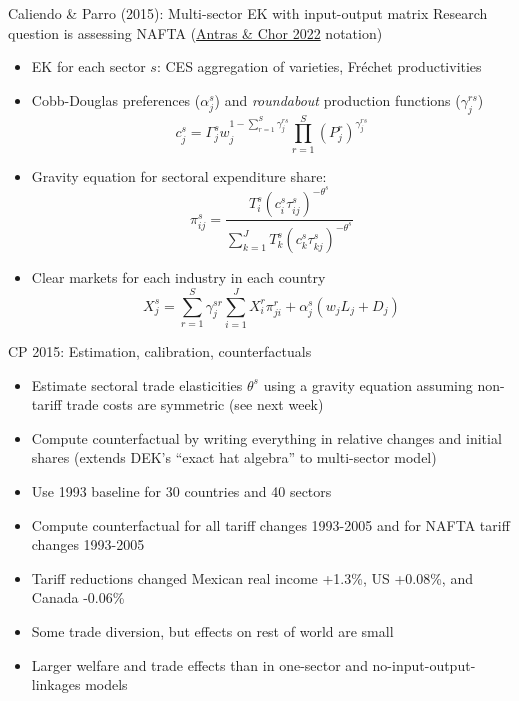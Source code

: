\documentclass[11pt,notes=hide,aspectratio=169]{beamer}
\begin{document}
\begin{frame}{Caliendo \& Parro (2015): Multi-sector EK with input-output matrix}
Research question is assessing NAFTA
(\href{https://doi.org/10.1016/bs.hesint.2022.02.005}{Antras \& Chor 2022} notation)
\begin{itemize}	
\item EK for each sector $s$: CES aggregation of varieties, Fréchet productivities %
\item Cobb-Douglas preferences ($\alpha_{j}^s$) and \textit{roundabout} production functions ($\gamma_{j}^{rs}$)
$$
c_{j}^{s}
=
\Gamma_{j}^{s} w_j^{1-\sum_{r=1}^{S} \gamma_{j}^{rs}} \prod_{r=1}^{S} \left(P_{j}^{r}\right)^{\gamma_{j}^{rs}}
$$
\item Gravity equation for sectoral expenditure share:
$$
\pi_{ij}^{s}
=
\frac{T_{i}^{s}\left(c_{i}^{s}\tau_{ij}^{s}\right)^{-\theta^{s}}}
{\sum_{k=1}^{J} T_{k}^{s}\left(c_{k}^{s}\tau_{kj}^{s}\right)^{-\theta^{s}}}
$$
\item Clear markets for each industry in each country
$$
X_{j}^{s} = \sum_{r=1}^{S} \gamma_{j}^{sr}
\sum_{i=1}^{J} X_i^r \pi_{ji}^{r}
+ 
\alpha_{j}^{s}\left(w_j L_j + D_j\right)
$$
\end{itemize}
\end{frame}
\begin{frame}{CP 2015: Estimation, calibration, counterfactuals}
\begin{itemize}
\item Estimate sectoral trade elasticities $\theta^s$
using a gravity equation assuming non-tariff trade costs are symmetric
(see next week)
\item Compute counterfactual by writing everything in relative changes and initial shares
(extends DEK's ``exact hat algebra'' to multi-sector model)
\item Use 1993 baseline for 30 countries and 40 sectors
\item Compute counterfactual for all tariff changes 1993-2005
and for NAFTA tariff changes 1993-2005
\item Tariff reductions changed Mexican real income +1.3\%, US +0.08\%, and Canada -0.06\%
\item Some trade diversion, but effects on rest of world are small
\item Larger welfare and trade effects than in one-sector and no-input-output-linkages models
\end{itemize}
\end{frame}
\end{document}
